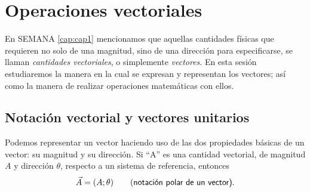 \setcounter{page}{11}
\chapter{Operaciones vectoriales}
\label{cap:cap2}
\vspace{-15ex}

\raggedright


En SEMANA \ref{cap:cap1} mencionamos que aquellas cantidades f\'isicas que requieren no solo de una magnitud, sino de una direcci\'on para especificarse, se llaman \textit{cantidades vectoriales}, o simplemente \textit{vectores}. En esta sesi\'on estudiaremos la manera en la cual se expresan y representan los vectores; así como la manera de realizar operaciones matemáticas con ellos.

\section{Notaci\'on vectorial y vectores unitarios}

 
Podemos representar un vector haciendo uso de las dos propiedades b\'asicas de un vector: su magnitud y su direcci\'on. Si ``A'' es una cantidad vectorial, de magnitud $A$ y direcci\'on $\theta$, respecto a un sistema de referencia, entonces 
$$\vec{A}=(A;\theta) \qquad \mbox{(\textsf{notaci\'on polar de un vector)}}. $$

